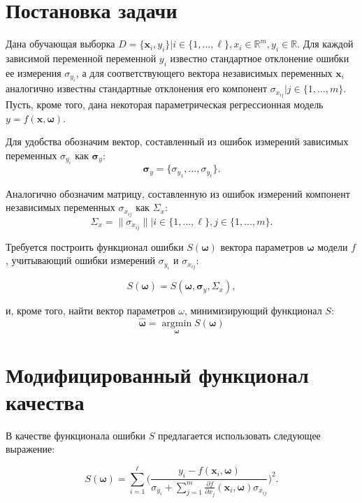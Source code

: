 \documentclass[11pt,a4paper]{article}
\newcommand{\bomega}{\boldsymbol{\omega}}
\begin{document}
\section{Постановка задачи}

Дана обучающая выборка $D = \{ \mathbf{x}_i, y_i \} | i \in \{ 1, \dots, \ell \}, x_i \in \mathbb{R}^m, y_i \in \mathbb{R}$.
Для каждой зависимой переменной переменной $y_i$ известно
стандартное отклонение ошибки ее измерения $\sigma_{y_i}$, а для соответствующего
вектора независимых переменных $\mathbf{x}_i$ аналогично известны стандартные
отклонения его компонент $\sigma_{x_{ij}} | j \in \{ 1, \dots, m \}$.
Пусть, кроме того, дана некоторая параметрическая регрессионная модель
$y = f (\mathbf{x}, \bomega)$.

Для удобства обозначим вектор, составленный из ошибок измерений зависимых переменных
$\sigma_{y_i}$ как $\boldsymbol{\sigma}_y$:
\[
  \boldsymbol{\sigma}_y = \{ \sigma_{y_1}, \dots, \sigma_{y_{\ell}} \}.
\]

Аналогично обозначим матрицу, составленную из ошибок измерений компонент
независимых переменных $\sigma_{x_{ij}}$ как $\Sigma_x$:
\[
  \Sigma_x = \| \sigma_{x_{ij}} \| | i \in \{ 1, \dots, \ell \}, j \in \{ 1, \dots, m \}.
\]

Требуется построить функционал ошибки $S(\bomega)$ вектора параметров
$\bomega$ модели $f$, учитывающий ошибки измерений $\sigma_{y_i}$ и
$\sigma_{x_{ij}}$:

\begin{equation}
  S(\bomega) = S(\bomega, \boldsymbol{\sigma}_y, \Sigma_x),
\end{equation}

и, кроме того, найти вектор параметров $\omega$, минимизирующий функционал
$S$:
\begin{equation}
  \hat{\bomega} = \mathop{\arg \min}\limits_{\bomega} S(\bomega)
\end{equation}

\section{Модифицированный функционал качества}

В качестве функционала ошибки $S$ предлагается использовать следующее выражение:

\begin{equation}
  S(\boldsymbol{\omega}) = \sum_{i = 1}^\ell \Big( \frac{y_i - f(\mathbf{x}_i, \boldsymbol{\omega})}{\sigma_{y_i} + \sum_{j = 1}^m \frac{\partial f}{\partial x_j}(\mathbf{x}_i, \boldsymbol{\omega}) \sigma_{x_{ij}}} \Big)^2.
\end{equation}

\FloatBarrier


%
%

\end{document}
